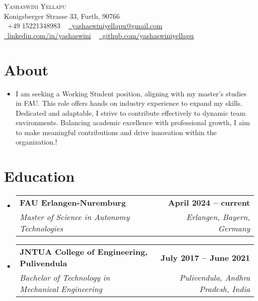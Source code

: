 \documentclass[letterpaper,11pt]{article}
\makeatletter
\newcommand{\resumeItem}[1]{
  \item\small{
    {#1 \vspace{-2pt}}
  }
}
\newcommand{\resumeSubheading}[4]{
  \vspace{-2pt}\item
    \begin{tabular*}{1.0\textwidth}[t]{l@{\extracolsep{\fill}}r}
      \textbf{#1} & \textbf{\small #2} \\
      \textit{\small#3} & \textit{\small #4} \\
    \end{tabular*}\vspace{-7pt}
}
\newcommand{\resumeSubHeadingListStart}{\begin{itemize}[leftmargin=0.0in, label={}]}
\newcommand{\resumeSubHeadingListEnd}{\end{itemize}}
\makeatother
\begin{document}

\begin{center}
  {\Huge \scshape Yashaswini Yellapu} \\ \vspace{1pt}
  Konigsberger Strasse 33, Furth, 90766 \\ \vspace{1pt}
  \small \raisebox{-0.1\height}\faPhone\ +49 15221348983 ~ \href{mailto:yashaswiniyellapu@gmail.com}{\raisebox{-0.2\height}\faEnvelope\  \underline{yashaswiniyellapu@gmail.com}} ~
  \href{https://www.linkedin.com/in/yashaswini-y-200500149/}{\raisebox{-0.2\height}\faLinkedin\ \underline{linkedin.com/in/yashaswini}}  ~
  \href{https://github.com/yashaswiniyellapu}{\raisebox{-0.2\height}\faGithub\ \underline{github.com/yashaswiniyellapu}}
  \vspace{-8pt}
\end{center}

\section{About}
\resumeSubHeadingListStart
\resumeItem{I am seeking a Working Student position, aligning with my master's studies in FAU. This role offers hands
  on industry experience to expand my skills. Dedicated and adaptable, I strive to contribute effectively to
  dynamic team environments. Balancing academic excellence with professional growth, I aim to make
  meaningful contributions and drive innovation within the organization.!}
\resumeSubHeadingListEnd
\vspace{-16pt}

\section{Education}
\resumeSubHeadingListStart
\resumeSubheading
{FAU Erlangen-Nuremburg}{April 2024 -- current}
{Master of Science in Autonomy Technologies}{Erlangen, Bayern, Germany}
\resumeSubheading
{JNTUA College of Engineering, Pulivendula}{July 2017 -- June 2021}
{Bachelor of Technology in Mechanical Engineering}{Pulivendula, Andhra Pradesh, India}
\resumeSubHeadingListEnd
\end{document}
